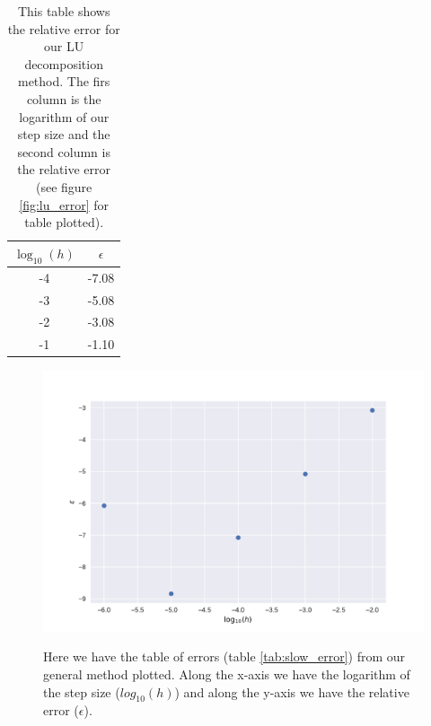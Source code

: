 \documentclass[reprint, english,notitlepage]{revtex4-1}  %
\begin{document}
\begin{table} [h]  %
	\begin{tabular}{||c | c||}
			\hline
			$\log_{10}(h)$ & $\epsilon$    \\ \hline
			-4 & -7.08    \\ \hline
			-3 & -5.08    \\ \hline
			-2 & -3.08    \\ \hline
			-1 & -1.10    \\ \hline
	\end{tabular}
	\caption{This table shows the relative error for our LU decomposition method. The firs column is the logarithm of our step size and the second column is the relative error (see figure \ref{fig:lu_error} for table plotted).}
	\label{tab:lu_error}
\end{table}


\begin{figure}[h]
	\centering
	\includegraphics[scale=0.5]{../output/slow_errors.pdf}
	\label{fig:slow_error}
	\caption{Here we have the table of errors (table \ref{tab:slow_error}) from our general method plotted. Along the x-axis we have the logarithm of the step size ($log_{10}(h)$) and along the y-axis we have the relative error ($\epsilon$).}
\end{figure}
\end{document}
